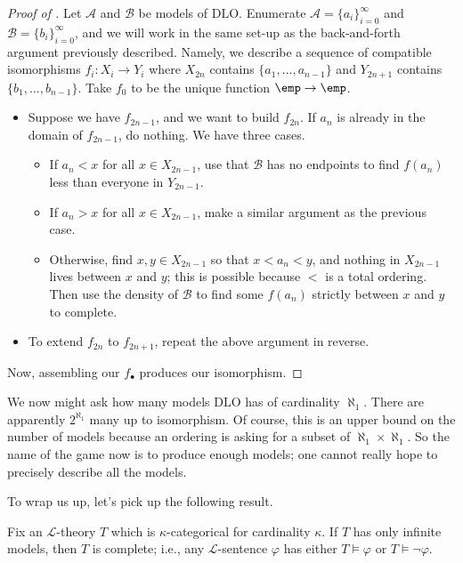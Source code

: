 \documentclass[../notes.tex]{subfiles}
\begin{document}
\begin{proof}[Proof of ]
	Let $\mathcal A$ and $\mathcal B$ be models of $\mathrm{DLO}$. Enumerate $\mathcal A=\{a_i\}_{i=0}^\infty$ and $\mathcal B=\{b_i\}_{i=0}^\infty$, and we will work in the same set-up as the back-and-forth argument previously described. Namely, we describe a sequence of compatible isomorphisms $f_i\colon X_i\to Y_i$ where $X_{2n}$ contains $\{a_1,\ldots,a_{n-1}\}$ and $Y_{2n+1}$ contains $\{b_1,\ldots,b_{n-1}\}$. Take $f_0$ to be the unique function $\emp\to\emp$.
	\begin{itemize}
		\item Suppose we have $f_{2n-1}$, and we want to build $f_{2n}$. If $a_n$ is already in the domain of $f_{2n-1}$, do nothing. We have three cases.
		\begin{itemize}
			\item If $a_n<x$ for all $x\in X_{2n-1}$, use that $\mathcal B$ has no endpoints to find $f(a_n)$ less than everyone in $Y_{2n-1}$.
			\item If $a_n>x$ for all $x\in X_{2n-1}$, make a similar argument as the previous case.
			\item Otherwise, find $x,y\in X_{2n-1}$ so that $x<a_n<y$, and nothing in $X_{2n-1}$ lives between $x$ and $y$; this is possible because $<$ is a total ordering. Then use the density of $\mathcal B$ to find some $f(a_n)$ strictly between $x$ and $y$ to complete.
		\end{itemize}
		\item To extend $f_{2n}$ to $f_{2n+1}$, repeat the above argument in reverse.
	\end{itemize}
	Now, assembling our $f_\bullet$ produces our isomorphism.
\end{proof}
\begin{remark}
	We now might ask how many models $\mathrm{DLO}$ has of cardinality $\aleph_1$. There are apparently $2^{\aleph_1}$ many up to isomorphism. Of course, this is an upper bound on the number of models because an ordering is asking for a subset of $\aleph_1\times\aleph_1$. So the name of the game now is to produce enough models; one cannot really hope to precisely describe all the models.
\end{remark}
To wrap us up, let's pick up the following result.
\begin{proposition} \label{prop:kappa-categorical-is-complete}
	Fix an $\mathcal L$-theory $T$ which is $\kappa$-categorical for cardinality $\kappa$. If $T$ has only infinite models, then $T$ is complete; i.e., any $\mathcal L$-sentence $\varphi$ has either $T\models\varphi$ or $T\models\lnot\varphi$.
\end{proposition}
\end{document}
